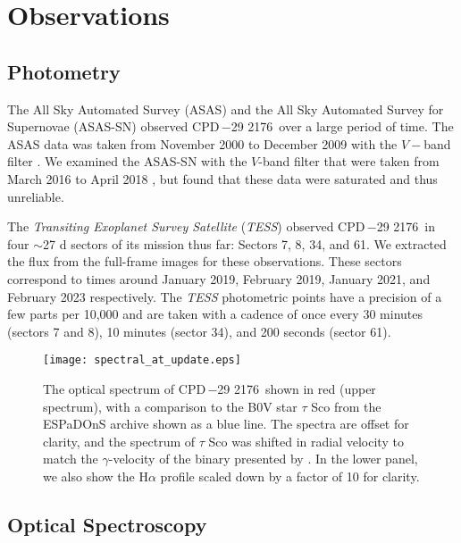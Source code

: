 \documentclass[]{aastex631}
\newcommand{\target}{CPD\,$-$29 2176}
\begin{document}
\section{Observations}



\subsection{Photometry}
The All Sky Automated Survey (ASAS) and the All Sky Automated Survey for Supernovae (ASAS-SN) observed \target\ over a large period of time. The ASAS data was taken from November 2000 to December 2009 with the $V-$band filter \citep{1997AcA....47..467P, 2003AcA....53..341P}. We examined the ASAS-SN with the $V$-band filter that were taken from March 2016 to April 2018 \citep{2014ApJ...788...48S, 2017PASP..129j4502K}, but found that these data were saturated and thus unreliable. 

The \textit{Transiting Exoplanet Survey Satellite} (\textit{TESS}) observed \target\ in four $\sim$27 d sectors of its mission thus far: Sectors 7, 8, 34, and 61. We extracted the flux from the full-frame images for these observations. These sectors correspond to times around January 2019, February 2019, January 2021, and February 2023 respectively. The \textit{TESS} photometric points have a precision of a few parts per 10,000 and are taken with a cadence of once every 30 minutes (sectors 7 and 8), 10 minutes (sector 34), and 200 seconds (sector 61).

\begin{figure}
    \centering
    \texttt{[image: spectral\_at\_update.eps]}
    \caption{The optical spectrum of \target\, shown in red (upper spectrum), with a comparison to the B0V star $\tau$ Sco from the ESPaDOnS archive shown as a blue line. The spectra are offset for clarity, and the spectrum of $\tau$ Sco was shifted in radial velocity to match the $\gamma$-velocity of the binary presented by \citet{noel}. In the lower panel, we also show the H$\alpha$ profile scaled down by a factor of 10 for clarity.}
    \label{fig:spec_atlas}
\end{figure}

\subsection{Optical Spectroscopy}
\end{document}
